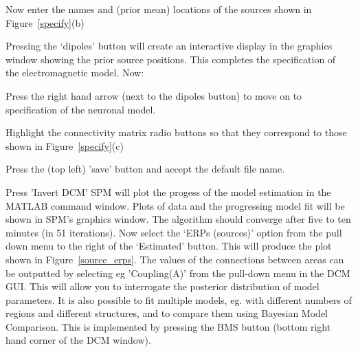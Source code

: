 \item{Now enter the names and (prior mean) locations of the sources shown in Figure~\ref{specify}(b)}
\item{Pressing the `dipoles' button will create an interactive display in the graphics window showing the prior source positions.}
\ei
This completes the specification of the electromagnetic model. Now:
\bi
\item{Press the right hand arrow (next to the dipoles button) to move on to specification of the neuronal model.}
\item{Highlight the connectivity matrix radio buttons so that they  correspond to those shown in Figure~\ref{specify}(c)}
    \item{Press the (top left) 'save' button and accept the default file name.}
\item{Press 'Invert DCM'}
\ei
SPM will plot the progess of the model estimation in the MATLAB command window. Plots of data and the progressing model fit will be shown in SPM's graphics window. The algorithm should converge after
five to ten minutes (in 51 iterations). Now select the `ERPs (sources)' option from the pull down menu to the right of the `Estimated' button. This will produce the plot shown in Figure~\ref{source_erps}. The values of the connections between areas can be outputted by selecting eg 'Coupling(A)' from the pull-down menu in the DCM GUI. This will allow you to interrogate the posterior distribution of model parameters. It is also possible to fit multiple models, eg. with different numbers of regions and different structures, and to compare them using Bayesian Model Comparison. This is implemented by pressing the BMS button (bottom right hand corner of the DCM window).



